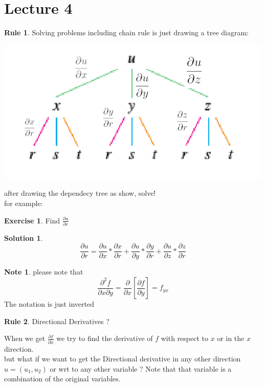 \documentclass[11pt]{article}
\theoremstyle{definition}
\newtheorem{reg}{Rule}
\newtheorem{exer}{Exercise}
\newtheorem{sln}{Solution}
\newtheorem{note}{Note}
\begin{document}
\section{Lecture 4}
\begin{reg}
Solving problems including chain rule is just drawing a tree diagram:
\end{reg}
\begin{center}
\includegraphics[scale=0.5]{images/tree.png}
\end{center}
after drawing the dependecy tree as show, solve! \\
for example: 
\begin{exer}
	Find $\frac{\partial u}{\partial r}$
\end{exer}
\begin{sln}
\begin{equation}
	\frac{\partial u}{\partial r} = \frac{\partial u}{\partial x} * \frac{\partial x}{\partial r} + \frac{\partial u}{\partial y} * \frac{\partial y}{\partial r}+ \frac{\partial u}{\partial z}* \frac{\partial z}{\partial r} 
\end{equation}
\end{sln}
\begin{note}
please note that 
\begin{equation}
	\frac{\partial^2 f}{\partial x \partial y } = \frac{\partial }{\partial x} [ \frac{\partial f}{\partial y }] = f_{yx}
\end{equation}
The notation is just inverted 
\end{note}
\begin{reg}
Directional Derivatives ?
\end{reg}
When we get $ \frac{\partial f}{\partial x} $ we try to find the derivative of $f$ with respect to $x$ or in the $x$ direction. 
\\ but what if we want to get the Directional derivative in any other direction $u=(u_1, u_2)$ or wrt to any other variable ? Note that that variable is a combination of the original variables. \\ 
\end{document}
